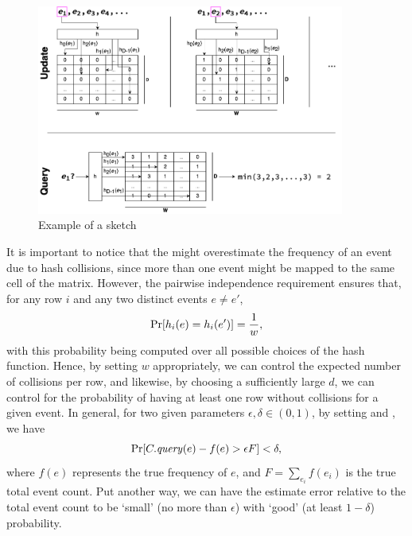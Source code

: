 \begin{figure}[htbp]
	\begin{center}
    \includegraphics[width=0.9\textwidth]{figures/cm-example}
	\end{center}
	\caption{Example of a \cm sketch}\label{fig:countminexample}
\end{figure}

It is important to notice that the \cm might overestimate the frequency of an event due to hash collisions, since more than one event might be mapped to the same cell of the matrix. However, the pairwise independence requirement ensures that, for any row $i$ and any two distinct events $e\neq e'$,
\begin{equation*}
\mathrm{Pr}[h_i(e)=h_i(e')] = \frac{1}{w},
\end{equation*}
with this probability being computed over all possible choices of the hash function.
Hence, by setting $w$ appropriately, we can control the expected number of collisions per row, and likewise, by choosing a sufficiently large $d$, we can control for the probability of having at least one row without collisions for a given event. In general, for two given parameters $\epsilon, \delta \in (0,1)$, by setting 
 and , we have
\begin{equation}
\label{eq:cm-prob}
\mathrm{Pr}[C.\mathit{query}(e) - f(e) > \epsilon F] < \delta,
\end{equation}
where $f(e)$ represents the true frequency of $e$, and $F=\sum_{e_i}f(e_i)$ is the true total event count. Put another way, we can have the estimate error relative to the total event count to be `small' (no more than $\epsilon$) with `good' (at least $1-\delta$) probability.

